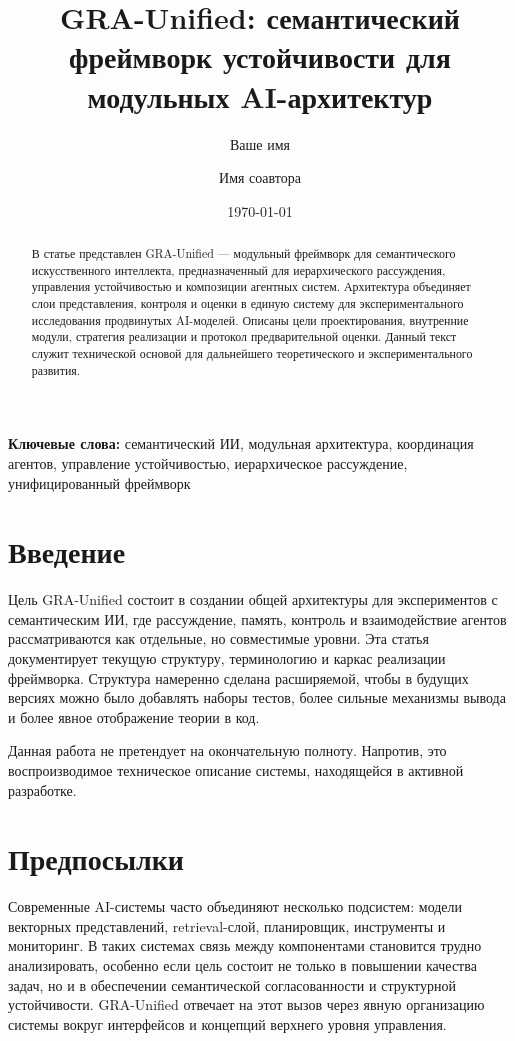 \documentclass[11pt,a4paper]{article}
\title{GRA-Unified: семантический фреймворк устойчивости для модульных AI-архитектур}
\author{Ваше имя \and Имя соавтора}
\date{\today}
\begin{document}
\maketitle

\begin{abstract}
В статье представлен GRA-Unified — модульный фреймворк для семантического искусственного интеллекта, предназначенный для иерархического рассуждения, управления устойчивостью и композиции агентных систем. Архитектура объединяет слои представления, контроля и оценки в единую систему для экспериментального исследования продвинутых AI-моделей. Описаны цели проектирования, внутренние модули, стратегия реализации и протокол предварительной оценки. Данный текст служит технической основой для дальнейшего теоретического и экспериментального развития.
\end{abstract}

\noindent\textbf{Ключевые слова:} семантический ИИ, модульная архитектура, координация агентов, управление устойчивостью, иерархическое рассуждение, унифицированный фреймворк

\tableofcontents
\newpage

\section{Введение}
Цель GRA-Unified состоит в создании общей архитектуры для экспериментов с семантическим ИИ, где рассуждение, память, контроль и взаимодействие агентов рассматриваются как отдельные, но совместимые уровни. Эта статья документирует текущую структуру, терминологию и каркас реализации фреймворка. Структура намеренно сделана расширяемой, чтобы в будущих версиях можно было добавлять наборы тестов, более сильные механизмы вывода и более явное отображение теории в код.

Данная работа не претендует на окончательную полноту. Напротив, это воспроизводимое техническое описание системы, находящейся в активной разработке.

\section{Предпосылки}
Современные AI-системы часто объединяют несколько подсистем: модели векторных представлений, retrieval-слой, планировщик, инструменты и мониторинг. В таких системах связь между компонентами становится трудно анализировать, особенно если цель состоит не только в повышении качества задач, но и в обеспечении семантической согласованности и структурной устойчивости. GRA-Unified отвечает на этот вызов через явную организацию системы вокруг интерфейсов и концепций верхнего уровня управления.
\end{document}
